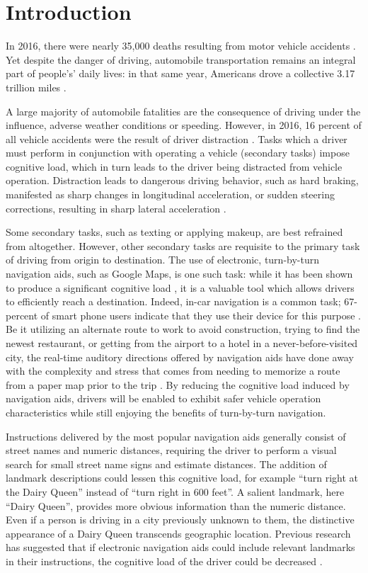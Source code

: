 \chapter{Introduction}\label{CH:introduction}
In 2016, there were nearly 35,000 deaths resulting from motor vehicle accidents \cite{crashes_48}. Yet despite the danger of driving, automobile transportation remains an integral part of people's’ daily lives: in that same year, Americans drove a collective 3.17 trillion miles \cite{crashes_48}.

A large majority of automobile fatalities are the consequence of driving under the influence, adverse weather conditions or speeding. However, in 2016, 16 percent of all vehicle accidents were the result of driver distraction \cite{distracted_nhtsa_17}.  Tasks which a driver must perform in conjunction with operating a vehicle (secondary tasks) impose cognitive load, which in turn leads to the driver being distracted from vehicle operation. Distraction leads to dangerous driving behavior, such as hard braking, manifested as sharp changes in longitudinal acceleration, or sudden steering corrections, resulting in sharp lateral acceleration \cite{harbluk_distraction_2002}. 

Some secondary tasks, such as texting or applying makeup, are best refrained from altogether. However, other secondary tasks are requisite to the primary task of driving from origin to destination. The use of electronic, turn-by-turn navigation aids, such as Google Maps, is one such task: while it has been shown to produce a significant cognitive load \cite{young_regan_distraction_2007}, it is a valuable tool which allows drivers to efficiently reach a destination. Indeed, in-car navigation is a common task; 67-percent of smart phone users indicate that they use their device for this purpose \cite{pew_smartphone}. Be it utilizing an alternate route to work to avoid construction, trying to find the newest restaurant, or getting from the airport to a hotel in a never-before-visited city, the real-time auditory directions offered by navigation aids have done away with the complexity and stress that comes from needing to memorize a route from a paper map prior to the trip \cite{walker1991vehicle}. By reducing the cognitive load induced by navigation aids, drivers will be enabled to exhibit safer vehicle operation characteristics while still enjoying the benefits of turn-by-turn navigation.

Instructions delivered by the most popular navigation aids generally consist of street names and numeric distances, requiring the driver to perform a visual search for small street name signs and estimate distances. The addition of landmark descriptions could lessen this cognitive load, for example “turn right at the Dairy Queen” instead of “turn right in 600 feet”. A salient landmark, here “Dairy Queen”, provides more obvious information than the numeric distance. Even if a person is driving in a city previously unknown to them, the distinctive appearance of a Dairy Queen transcends geographic location. Previous research has suggested that if electronic navigation aids could include relevant landmarks in their instructions, the cognitive load of the driver could be decreased \cite{burnett2000turn}.

